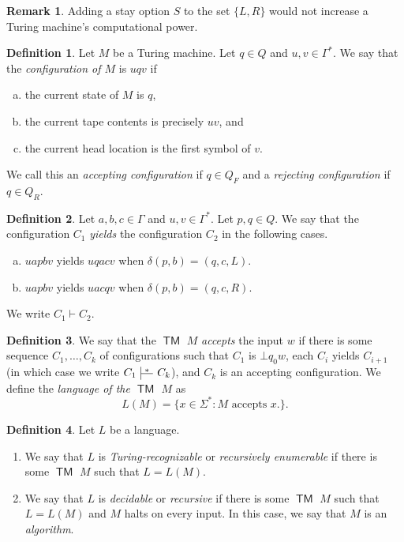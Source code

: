 \documentclass[10pt,letterpaper,cm]{nupset}
\theoremstyle{definition}
\newtheorem*{definition}{Definition}
\newtheorem{remark}{Remark}
\def\ruleoffset{1pt}
\newcommand\specialvdash[2]{\mathrel{\ensurestackMath{
  \mkern2mu\rule[-\dp\strutbox]{.4pt}{\baselineskip}\stackon[\ruleoffset]{
    \stackunder[\dimexpr\ruleoffset-.4\ht\strutbox+.4\dp\strutbox]{
      \rule[\dimexpr.4\ht\strutbox-.4\dp\strutbox]{2.5ex}{.4pt}}{
        \scriptstyle #1}}{\scriptstyle#2}\mkern2mu}}
}
\newcommand{\1}{\mathbf{1}}
\newcommand{\0}{\vec 0}
\DeclareMathOperator{\TM}{\mathsf{TM}}
\begin{document}
\begin{remark}
Adding a stay option $S$ to the set $\{L, R\}$ would not increase a Turing machine's computational power.
\end{remark}

\begin{definition}
Let $M$ be a Turing machine. Let $q\in Q$ and $u,v\in \Gamma^{\ast}$. We say that the \textit{configuration of $M$} is $uqv$ if 
\begin{enumerate}[(a)]
\item the current state of $M$ is $q$,
\item the current tape contents is precisely $uv$, and
\item the current head location is the first symbol of $v$.
\end{enumerate}
We call this an \textit{accepting configuration} if $q \in Q_F$ and a \textit{rejecting configuration} if $q \in Q_R$.
\end{definition}

\begin{definition}
Let $a,b,c\in \Gamma$ and $u,v\in \Gamma^{\ast}$. Let $p,q\in Q$. We say that the configuration $C_1$ \textit{yields} the configuration $C_2$ in the following cases. 
\begin{enumerate}[(a)]
\item $uapbv$ yields $uqacv$ when $\delta(p,b) = (q, c, L)$.
\item $uapbv$ yields $uacqv$ when $\delta(p, b) = (q, c, R)$. 
\end{enumerate}
We write $C_1 \vdash C_2$.
\end{definition}

\begin{definition}
We say that the $\TM$ $M$ \textit{accepts} the input $w$ if there is some sequence $C_1, \ldots, C_k$ of configurations such that $C_1$ is $\bot q_0w$, each $C_i$ yields $C_{i+1}$ (in which case we write $C_1 \specialvdash{}{*} C_k $), and $C_k$ is an accepting configuration.  We define the \textit{language of the $\TM$ $M$} as $$L(M) = \{x \in \Sigma^{\ast}: M \text{ accepts } x. \}.$$
\end{definition}

\begin{definition} Let $L$ be a language.
\begin{enumerate}
\item We say that $L$ is \textit{Turing-recognizable} or \textit{recursively enumerable} if there is some $\TM$ $M$ such that $L = L(M)$.
\item We say that $L$ is \textit{decidable} or \textit{recursive} if there is some $\TM$ $M$ such that $L= L(M)$ and $M$ halts on every input. In this case, we say that $M$ is an \textit{algorithm}.
\end{enumerate}
\end{definition}
\end{document}
